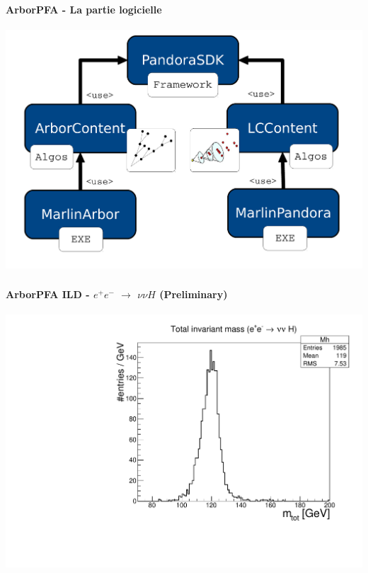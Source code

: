 \documentclass[8pt]{beamer}
\begin{document}
  \begin{frame}
  \frametitle{\backup}
  \framesubtitle{ArborPFA - La partie logicielle}
    \begin{center}
      \includegraphics[width=\linewidth]{ArborSoftwareView.pdf}
    \end{center}
  \end{frame}


  \begin{frame}
  \frametitle{\backup}
  \framesubtitle{ArborPFA ILD - $e^+e^-$ $\rightarrow$ $\nu\nu H$ (Preliminary)}
    \begin{center}
      \centering \includegraphics[width=0.7\linewidth]{nunuH_mass.pdf}
    \end{center}
  \end{frame}
\end{document}
